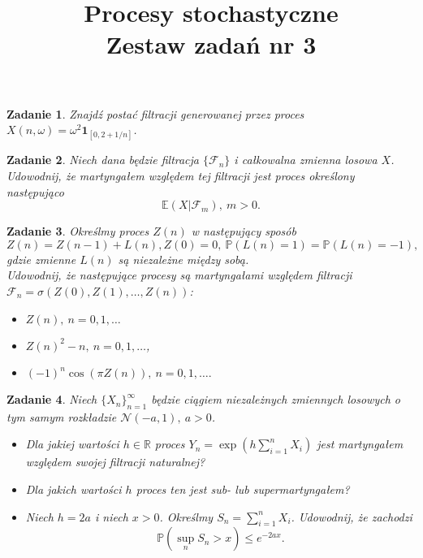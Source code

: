 \documentclass{mwart}
\title{Procesy stochastyczne\\ Zestaw zadań nr 3}
\newtheorem{zd}{Zadanie}
\begin{document}

\maketitle

\begin{zd}
Znajdź postać filtracji generowanej przez proces $X(n, \omega) = \omega^2\pmb{1}_{[0, 2+1/n]}$.
\end{zd}

\begin{zd}
Niech dana będzie filtracja $\{\mathcal{F}_n\}$ i całkowalna zmienna losowa $X$. Udowodnij, że martyngałem względem tej filtracji jest proces określony
następująco
\begin{displaymath}
\mathbb{E}\left(X|\mathcal{F}_m\right),\ m>0.
\end{displaymath}
\end{zd}

\begin{zd}
	Określmy proces $Z(n)$ w następujący sposób
	\begin{displaymath}
		Z(n) = Z(n-1) + L(n), Z(0) = 0,\  \mathbb{P}(L(n) = 1)  = \mathbb{P}(L(n) = -1),
	\end{displaymath}
	gdzie zmienne $L(n)$ są niezależne między sobą.\\
	Udowodnij, że następujące procesy są martyngałami względem filtracji $\mathcal{F}_n = \sigma\left(Z(0), Z(1), \dots, Z(n)\right)$:
	\begin{itemize}
		\item $Z(n), \ n= 0, 1, \dots$
		\item $Z(n)^2 - n, \ n= 0, 1, \dots$,
		\item $ (-1)^n\cos \left(\pi Z(n)\right), \ n= 0, 1, \dots.$
	\end{itemize}
\end{zd}

\begin{zd}
Niech $\{X_n\}_{n=1}^{\infty}$ będzie ciągiem niezależnych zmiennych losowych o tym samym rozkładzie $\mathcal{N}\left(-a, 1\right),\ a >0$.
\begin{itemize}
\item Dla jakiej wartości $h\in \mathbb{R}$ proces $Y_n = \exp \left(h\sum_{i = 1}^nX_i\right)$ jest martyngałem względem swojej filtracji naturalnej?
\item Dla jakich wartości $h$ proces ten jest sub- lub supermartyngałem?
\item Niech $h=2a$ i niech $x > 0$. Określmy $S_n = \sum_{i=1}^nX_i$. Udowodnij, że zachodzi
\begin{displaymath}
\mathbb{P}\left(\sup_nS_n > x\right) \leq e^{-2ax}.
\end{displaymath}
\end{itemize}
\end{zd}
\end{document}
